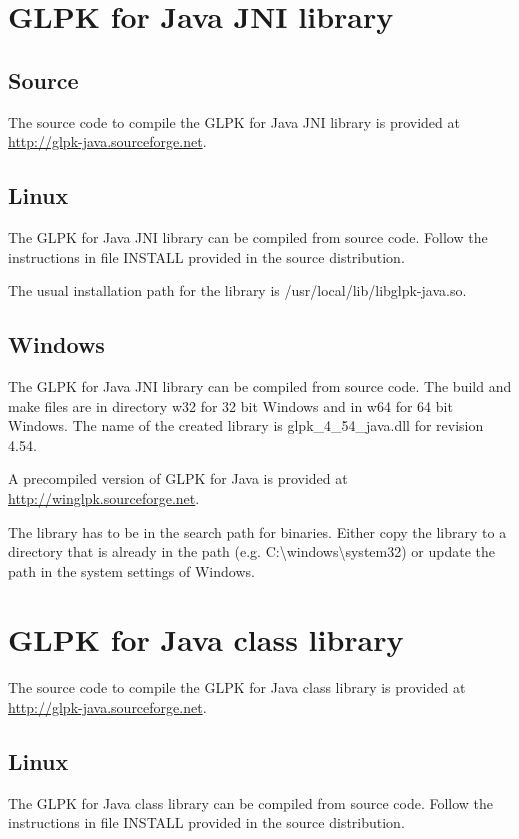 \documentclass[a4paper,11pt]{report}
\newcommand{\glpkVersionMajor}{4}
\newcommand{\glpkVersionMinor}{54}
\begin{document}
\section{GLPK for Java JNI library}
\subsection{Source}
The source code to compile the GLPK for Java JNI library is provided at \linebreak\href{http://glpk-java.sourceforge.net}{http://glpk-java.sourceforge.net}.

\subsection{Linux}
The GLPK for Java JNI library can be compiled from source code. Follow the instructions in file INSTALL provided in the source distribution.

The usual installation path for the library is /usr/local/lib/libglpk-java.so.
\subsection{Windows}
The GLPK for Java JNI library can be compiled from source code. The build and make files are in directory w32 for 32 bit Windows and in w64 for 64 bit Windows. The name of the created library is glpk\_\glpkVersionMajor\_\glpkVersionMinor\_java.dll for revision \glpkVersionMajor.\glpkVersionMinor.

A precompiled version of GLPK for Java is provided at \linebreak\href{http://winglpk.sourceforge.net}{http://winglpk.sourceforge.net}.

The library has to be in the search path for binaries. Either copy the library to a directory that is already in the path (e.g. C:\textbackslash windows\textbackslash system32) or update the path in the system settings of Windows.

\section{GLPK for Java class library}
The source code to compile the GLPK for Java class library is provided at \linebreak\href{http://glpk-java.sourceforge.net}{http://glpk-java.sourceforge.net}.

\subsection{Linux}
The GLPK for Java class library can be compiled from source code. Follow the instructions in file INSTALL provided in the source distribution.
\end{document}
